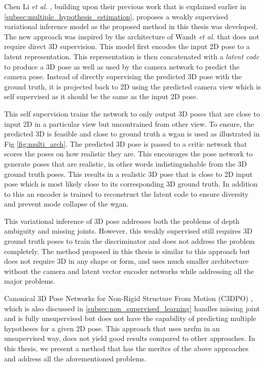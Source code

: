 Chen Li \textit{et al.} \cite{weaklymultiple}, building upon their previous work \cite{multiplehypo} that is explained earlier in \ref{subsec:multiple_hypothesis_estimation}, proposes a weakly supervised variational inference model as the proposed method in this thesis was developed. The new approach \cite{weaklymultiple} was inspired by the architecture of Wandt \textit{et al.} \cite{repnet} that does not require direct 3D supervision. This model first encodes the input 2D pose to a latent representation. This representation is then concatenated with a \textit{latent code} to produce a 3D pose as well as used by the camera network to predict the camera pose. Instead of directly supervising the predicted 3D pose with the ground truth, it is projected back to 2D using the predicted camera view which is self supervised as it should be the same as the input 2D pose. 

This self supervision trains the network to only output 3D poses that are close to input 2D in a particular view but uncontrained from other view. To ensure, the predicted 3D is feasible and close to ground truth a \ac{wgan} is used as illustrated in Fig \ref{fig:multi_arch}. The predicted 3D pose is passed to a critic network that scores the poses on how realistic they are. This encourages the pose network to generate poses that are realistic, in other words indistingushable from the 3D ground truth poses. This results in a realistic 3D pose that is close to 2D input pose which is most likely close to its corresponding 3D ground truth. In addition to this an encoder is trained to reconstruct the latent code to ensure diversity and prevent mode collapse of the \ac{wgan}. 

This variational inference of 3D pose addresses both the problems of depth ambiguity and missing joints. However, this weakly supervised still requires 3D ground truth poses to train the discriminator and does not address the problem completely. The method proposed in this thesis is similar to this approach but does not require 3D in any shape or form, and uses much smaller architecture without the camera and latent vector encoder networks while addressing all the major problems. 

Canonical 3D Pose Networks for Non-Rigid Structure From Motion (C3DPO) \cite{c3dpo}, which is also discussed in \ref{subsec:non_supervised_learning} handles missing joint and is fully unsupervised but does not have the capability of predicting multiple hypotheses for a given 2D pose. This approach that uses \ac{nrsfm} in an unsupervised way, does not yield good results compared to other approaches. In this thesis, we present a method that has the meritcs of the above approaches and address all the aforementioned problems.
